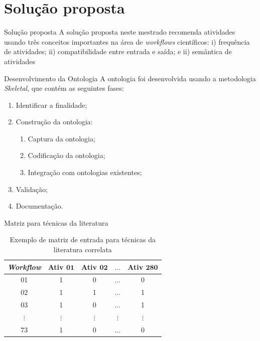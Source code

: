 \section{Solução proposta}

\begin{frame}		
	\begin{block}{Solução proposta}
		A solução proposta neste mestrado recomenda atividades usando três conceitos importantes na área de \emph{workflows} científicos: i) frequência de atividades; ii) compatibilidade entre entrada e saída; e ii) semântica de atividades
	\end{block}
\end{frame}


\begin{frame}		
	\begin{block}{Desenvolvimento da Ontologia}
		A ontologia foi desenvolvida usando a metodologia \emph{Skeletal}, que contém as seguintes fases:
		\begin{enumerate}
			\item Identificar a finalidade;
			\item Construção da ontologia:
			\begin{enumerate}
				\item Captura da ontologia;
				\item Codificação da ontologia;
				\item Integração com ontologias existentes;
			\end{enumerate}
			\item Validação;
			\item Documentação.
		\end{enumerate}
	\end{block}
\end{frame}


\begin{frame}		
	\begin{block}{Matriz para técnicas da literatura}
		\begin{table}[htb]
			\centering
			\caption{Exemplo de matriz de entrada para técnicas da literatura correlata}
			\begin{tabular}{|c|c|c|c|c|}  \hline
				\textbf{\emph{Workflow}} & \textbf{Ativ \(\mathbf{01}\)} & \textbf{Ativ \(\mathbf{02}\)} & \textbf{\(\mathbf{\ldots}\)} & \textbf{Ativ \(\mathbf{280}\)}  \\ \hline
				01 			  & 1 			  & 0 			  & \(\ldots\) 	  & 0  				\\ \hline
				02 			  & 1 			  & 1 			  & \(\ldots\) 	  & 1  				\\ \hline
				03 			  & 1 			  & 0 			  & \(\ldots\) 	  & 1  				\\ \hline
				\(\vdots\) 		  			  & \(\vdots\) 	  & \(\vdots\) 	  & \(\vdots\) 	  & \(\vdots\) 		\\ \hline
				73 			  & 1 			  & 0 			  & \(\ldots\) 	  & 0  				\\ \hline
			\end{tabular}
			\label{tabela_matriz_de_dados}
		\end{table}
	\end{block}
\end{frame}


